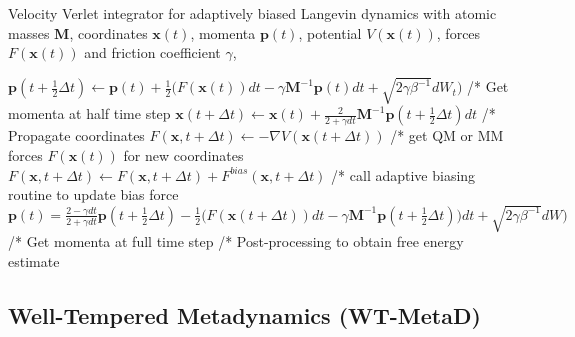 \begin{algorithm}[H]
  \caption{Velocity Verlet integrator for adaptively biased Langevin dynamics with atomic masses $\textbf{M}$, coordinates $\textbf{x}(t)$, momenta $\textbf{p}(t)$, potential $V(\textbf{x}(t))$, forces $F(\textbf{x}(t))$ and friction coefficient $\gamma$,}
  \label{alg:ABM}
    \begin{algorithmic}
        \STATE
            \STATE $\textbf{p}(t+\frac{1}{2}\Delta t) \leftarrow \textbf{p}(t) + \frac{1}{2} \bigl(F(\textbf{x}(t))dt-\gamma \textbf{M}^{-1}\textbf{p}(t) dt + \sqrt{2\gamma\beta^{-1}}dW_t \bigr)$
        \STATE /* Get momenta at half time step
        \STATE
            \STATE $\textbf{x}(t+\Delta t) \leftarrow \textbf{x}(t) + \frac{2}{2+\gamma dt}\textbf{M}^{-1} \textbf{p}(t+\frac{1}{2}\Delta t) dt$
        \STATE /* Propagate coordinates
        \STATE
        \STATE $F(\textbf{x},t+\Delta t) \leftarrow - \nabla V(\textbf{x}(t+\Delta t))$
        \STATE /* get QM or MM forces $F(\textbf{x}(t))$ for new coordinates
        \STATE
        \STATE $F(\textbf{x},t+\Delta t) \leftarrow F(\textbf{x},t+\Delta t) + F^{bias}(\textbf{x},t+\Delta t)$
        \STATE /* call adaptive biasing routine to update bias force
        \STATE
            \STATE $\textbf{p}(t) = \frac{2 - \gamma dt}{2+\gamma dt} \textbf{p}(t+\frac{1}{2}\Delta t) - \frac{1}{2} \bigl(F(\textbf{x}(t+\Delta t))dt-\gamma \textbf{M}^{-1}\textbf{p}(t+\frac{1}{2}\Delta t)) dt + \sqrt{2\gamma\beta^{-1}}dW\bigr)$
        \STATE /* Get momenta at full time step
        \STATE
      \ENDWHILE
      \STATE /* Post-processing to obtain free energy estimate
    \end{algorithmic}
\end{algorithm}

\subsection{Well-Tempered Metadynamics (WT-MetaD)}
\label{sec:metaD}

